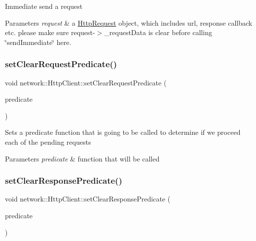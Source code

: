Immediate send a request


\begin{DoxyParams}{Parameters}
{\em request} & a \hyperlink{classnetwork_1_1HttpRequest}{Http\+Request} object, which includes url, response callback etc. please make sure request-\/$>$\+\_\+request\+Data is clear before calling \char`\"{}send\+Immediate\char`\"{} here. \\
\hline
\end{DoxyParams}
\mbox{\label{classnetwork_1_1HttpClient_acb6100ab800ab4e574b088086eac9c18}} 
\subsubsection{\texorpdfstring{set\+Clear\+Request\+Predicate()}{setClearRequestPredicate()}}
{\footnotesize\ttfamily void network\+::\+Http\+Client\+::set\+Clear\+Request\+Predicate (\begin{DoxyParamCaption}\item[{Clear\+Request\+Predicate}]{predicate }\end{DoxyParamCaption})\hspace{0.3cm}{\ttfamily [inline]}}

Sets a predicate function that is going to be called to determine if we proceed each of the pending requests


\begin{DoxyParams}{Parameters}
{\em predicate} & function that will be called \\
\hline
\end{DoxyParams}
\mbox{\label{classnetwork_1_1HttpClient_a0c7a9013ab5e56bee8efef1c79062665}} 
\subsubsection{\texorpdfstring{set\+Clear\+Response\+Predicate()}{setClearResponsePredicate()}}
{\footnotesize\ttfamily void network\+::\+Http\+Client\+::set\+Clear\+Response\+Predicate (\begin{DoxyParamCaption}\item[{Clear\+Response\+Predicate}]{predicate }\end{DoxyParamCaption})\hspace{0.3cm}{\ttfamily [inline]}}


